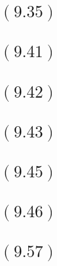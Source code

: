 \documentclass[letterpaper,12pt,titlepage]{article}
\begin{document}
\begin{mdframed}[style=MyFrame]
\end{mdframed}

\section*{$(9.35)$} 

\begin{mdframed}[style=MyFrame]
\end{mdframed}

\section*{$(9.41)$} 

\begin{mdframed}[style=MyFrame]
\end{mdframed}

\section*{$(9.42)$} 

\begin{mdframed}[style=MyFrame]
\end{mdframed}

\section*{$(9.43)$} 

\begin{mdframed}[style=MyFrame]
\end{mdframed}

\section*{$(9.45)$} 

\begin{mdframed}[style=MyFrame]
\end{mdframed}

\section*{$(9.46)$} 

\begin{mdframed}[style=MyFrame]
\end{mdframed}

\section*{$(9.57)$} 

\begin{mdframed}[style=MyFrame]
\end{mdframed}




\end{document}

